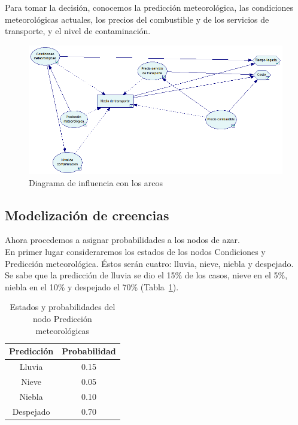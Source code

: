 \documentclass[12pt,a4paper,twoside,openright,titlepage,final]{article}
\begin{document}
Para tomar la decisión, conocemos la predicción meteorológica, las condiciones meteorológicas actuales, los precios del combustible y de los servicios de transporte, y el nivel de contaminación.

\begin{figure}[tbph!]
	\centering
	\includegraphics[width=0.9\linewidth]{imagenes/diagrama_2}
	\caption{Diagrama de influencia con los arcos}
	\label{fig:diagrama_2}
\end{figure}

\subsection{Modelización de creencias}

Ahora procedemos a asignar probabilidades a los nodos de azar.\\

En primer lugar consideraremos los estados de los nodos Condiciones y Predicción meteorológica. Éstos serán cuatro: lluvia, nieve, niebla y despejado.\\

Se sabe que la predicción de lluvia se dio el 15\% de los casos, nieve en el 5\%, niebla en el 10\% y despejado el 70\% (Tabla~\ref{tbl:prob_pred_met}).\\   

\begin{table}[htbp!]
\centering
\caption{Estados y probabilidades del nodo Predicción meteorológicas}
\label{tbl:prob_pred_met}
\begin{tabular}{@{}cc@{}}
\toprule
Predicción & Probabilidad \\ \midrule
Lluvia     & 0.15         \\
Nieve      & 0.05         \\
Niebla     & 0.10         \\
Despejado  & 0.70         \\ \bottomrule
\end{tabular}
\end{table}
\end{document}
